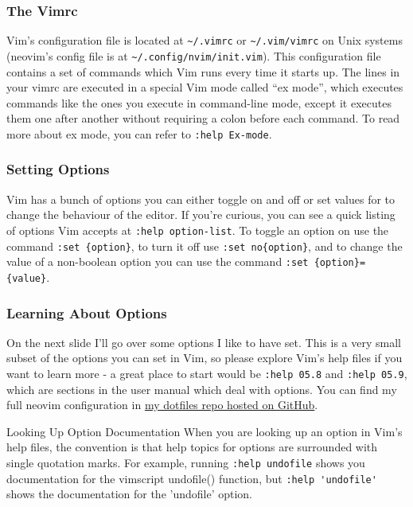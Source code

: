 \documentclass{beamer}
\begin{document}
\begin{frame}[fragile]
    \frametitle{The Vimrc}
	\small
	Vim's configuration file is located at \verb+~/.vimrc+ or \verb+~/.vim/vimrc+ on Unix systems (neovim's config file is at \verb+~/.config/nvim/init.vim+). This configuration file contains a set of commands which Vim runs every time it starts up. The lines in your vimrc are executed in a special Vim mode called \enquote{ex mode}, which executes commands like the ones you execute in command-line mode, except it executes them one after another without requiring a colon before each command. To read more about ex mode, you can refer to \verb+:help Ex-mode+.
\end{frame}

\begin{frame}[fragile]
    \frametitle{Setting Options}
    \small
    Vim has a bunch of options you can either toggle on and off or set values for to change the behaviour of the editor. If you're curious, you can see a quick listing of options Vim accepts at \verb+:help option-list+. To toggle an option on use the command \verb+:set {option}+, to turn it off use \verb+:set no{option}+, and to change the value of a non-boolean option you can use the command \verb+:set {option}={value}+.\\
\end{frame}

\begin{frame}[fragile]
    \frametitle{Learning About Options}
    \small
    On the next slide I'll go over some options I like to have set. This is a very small subset of the options you can set in Vim, so please explore Vim's help files if you want to learn more - a great place to start would be \verb+:help 05.8+ and \verb+:help 05.9+, which are sections in the user manual which deal with options. You can find my full neovim configuration in \href{https://github.com/alec-gibson/dotfiles}{my dotfiles repo hosted on GitHub}.
    \begin{block}{Looking Up Option Documentation}
	When you are looking up an option in Vim's help files, the convention is that help topics for options are surrounded with single quotation marks. For example, running \verb+:help undofile+ shows you documentation for the vimscript undofile() function, but \verb+:help 'undofile'+ shows the documentation for the 'undofile' option.
    \end{block}
\end{frame}
\end{document}
